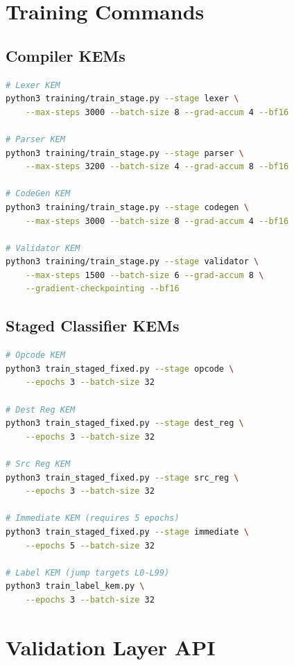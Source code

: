 \documentclass[11pt]{article}
\begin{document}
\section{Training Commands}

\subsection{Compiler KEMs}

\begin{lstlisting}[language=bash]
# Lexer KEM
python3 training/train_stage.py --stage lexer \
    --max-steps 3000 --batch-size 8 --grad-accum 4 --bf16

# Parser KEM
python3 training/train_stage.py --stage parser \
    --max-steps 3200 --batch-size 4 --grad-accum 8 --bf16

# CodeGen KEM
python3 training/train_stage.py --stage codegen \
    --max-steps 3000 --batch-size 8 --grad-accum 4 --bf16

# Validator KEM
python3 training/train_stage.py --stage validator \
    --max-steps 1500 --batch-size 6 --grad-accum 8 \
    --gradient-checkpointing --bf16
\end{lstlisting}

\subsection{Staged Classifier KEMs}

\begin{lstlisting}[language=bash]
# Opcode KEM
python3 train_staged_fixed.py --stage opcode \
    --epochs 3 --batch-size 32

# Dest Reg KEM
python3 train_staged_fixed.py --stage dest_reg \
    --epochs 3 --batch-size 32

# Src Reg KEM
python3 train_staged_fixed.py --stage src_reg \
    --epochs 3 --batch-size 32

# Immediate KEM (requires 5 epochs)
python3 train_staged_fixed.py --stage immediate \
    --epochs 5 --batch-size 32

# Label KEM (jump targets L0-L99)
python3 train_label_kem.py \
    --epochs 3 --batch-size 32
\end{lstlisting}

\section{Validation Layer API}
\end{document}
